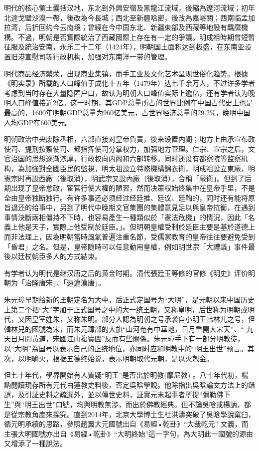 明代的核心領土囊括汉地，东北到外興安嶺及黑龍江流域，後縮為遼河流域；初年北達戈壁沙漠一帶，後改為今長城；西北至新疆哈密，後改為嘉峪關；西南临孟加拉湾，后折回约今云南境；曾經在今中国东北、新疆東部及西藏等地設有羈縻機構。不過，明朝是否實際統治了西藏國際上存在有一定的爭議。明成祖時期曾短暫征服及統治安南，永乐二十二年（1424年），明朝国土面积达到极盛，在东南亚设置旧港宣慰司等行政机构，加强对东南洋一带的管理。

明代商品经济繁荣，出现商业集镇，而手工业及文化艺术呈现世俗化趋势。根據《明实录》所载的人口峰值于成化十五年（1479年）达七千余万人，不过许多学者考虑到当时存在大量隐匿户口，故认为明朝人口峰值实际上逾亿，还有学者认为晚明人口峰值接近2亿。这一时期，其GDP总量所占的世界比例在中国古代史上也是最高的，1600年明朝GDP总量为960亿美元，占世界经济总量的29.2\%，晚明中国人均GDP在600美元。

明朝政治中央废除丞相，六部直接对皇帝負責，後来设置内阁；地方上由承宣布政使司、提刑按察使司、都指挥使司分掌权力，加强地方管理。仁宗、宣宗之后，文官治国的思想逐渐浓厚，行政权向内阁和六部转移。同时还设有都察院等监察机构，為加強對全國臣民的監視，明太祖設立特務機構錦衣衛，明成祖設立東廠，明憲宗时再設西廠（後取消），明武宗又設內廠（後取消），合稱「廠衛」。但到了后期出现了皇帝怠政，宦官行使大權的陋習，然而决策权始终集中在皇帝手里，不是全由皇帝独断独行。有许多事还必须经过经廷推、廷议、廷鞫的，同时还有能将原旨退还的给事中，另到了明代中晚期文官集團的集體意見足以與皇帝抗衡，在遇到事情決斷兩相僵持不下時，也容易產生一種類似於「憲法危機」的情況，因此「名義上他是天子，實際上他受制於廷臣。」。但明朝皇權受制於廷臣主要是基於道德上而非法理上，因為明朝當時風氣普遍注重名節，受儒家教育的皇帝往往要避免受到「昏君」之名。但是，皇帝隨時可以任意動用皇權，例如明世宗「大禮議」事件最後以廷杖朝臣多人的方式結束。

有学者认为明代是继汉唐之后的黄金时期。清代張廷玉等修的官修《明史》评价明朝为「治隆唐宋」、「遠邁漢唐」。

朱元璋早期给新的王朝定名为大中，后正式定国号为“大明”，是元朝以来中国历史上第二个把“大”字加于正式国号之中的大一统王朝，又称皇明，后世称为明朝或明代，又因皇室姓朱，又称朱明。部分人認為明朝之号承袭自小明王韩林儿之号，但韓林兒的國號為宋，而朱元璋部的大旗“山河奄有中華地，日月重開大宋天”、“ 九天日月開黃道，宋國江山複寶圖”反而有些關係。朱元璋手下有一部分明教徒，以“大明”為国号以表示自己的正统地位，亦同时应和明教中的“明王出世”预言。其次，以明喻火，根据五德终始说，表示明朝取代元朝，是以火剋金。

但七十年代，學界開始有人質疑“明王”是否出於明教(摩尼教) 。八十年代初，楊訥閱讀現存所有元代白蓮教史料後，否定吳晗學說。他除指出吳晗論文方法上的錯誤，及引証史料之疏漏外，並以傳世史料，証實元末起事者所提“彌勒佛下生”與“明王出世”口號，均與明教無涉，而出於佛教經典。但不論吳唅或楊訥，都是從宗教角度來探究。直到2014年，北京大學博士生杜洪濤突破了吳晗學說窠臼，循元明承續的思路，參照趙翼大元國號出自《易經•乾卦》“大哉乾元” 文義，而主張大明國號亦出自《易經•乾卦》“大明終始”這一字句，為大明此一國號的源由又增添了一種說法。

